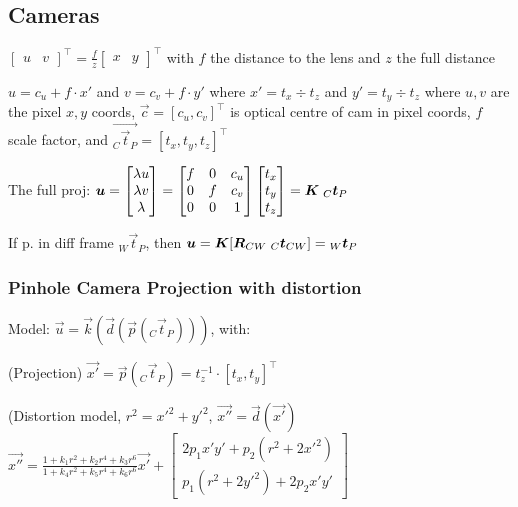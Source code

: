 \subsection{Cameras}
$\begin{bmatrix}
        u & v
    \end{bmatrix}^\top
    = \frac{f}{z}
    \begin{bmatrix}
        x & y
    \end{bmatrix}^\top$
with $f$ the distance to the lens and $z$ the full distance

\newpage
$u = c_u + f \cdot x'$ and $v = c_v + f \cdot y'$ where $x' = t_x \div t_z$ and $y' = t_y \div t_z$
where $u, v$ are the pixel $x, y$ coords, $\vec{c} = [c_u, c_v]^\top$ is optical centre of cam in pixel coords, $f$ scale factor,
and $\vec{{_C}\vec{t}_P} = [t_x, t_y, t_z]^\top$

The full proj: $\bm{u} = \begin{bmatrix}
        \lambda u \\
        \lambda v \\
        \lambda
    \end{bmatrix}
    =
    \begin{bmatrix}
        f & 0 & c_u \\
        0 & f & c_v \\
        0 & 0 & 1
    \end{bmatrix}
    \begin{bmatrix}
        t_x \\t_y\\t_z
    \end{bmatrix}
    = \bm{K}\; {_C}\bm{t}_P$

If p. in diff frame ${_W} \vec{t}_P$, then $\bm{u} = \bm{K}[\bm{R}_{CW}\; {_C}\bm{t}_{CW}] = {_W}\bm{t}_P$

\subsubsection{Pinhole Camera Projection with distortion}
\shortdefinition Model: $\vec{u} = \vec{k}(\vec{d}(\vec{p}({_C}\vec{t}_P)))$, with:

(Projection) $\vec{x'} = \vec{p}({_C}\vec{t}_P) = t_z^{-1} \cdot [t_x, t_y]^\top$

(Distortion model, $r^2 = x'^2 + y'^2$, $\vec{x''} = \vec{d}(\vec{x'})$\\
$\vec{x''} = \! \frac{1 + k_1 r^2 + k_2 r^4 + k_3 r^6}{1 + k_4 r^2 + k_5 r^4 + k_6 r^6} \vec{x'}
    + \begin{bmatrix}
        2p_1 x' y' + p_2(r^2 + 2x'^2) \\
        p_1 (r^2 + 2y'^2) + 2p_2 x'y'
    \end{bmatrix}$

